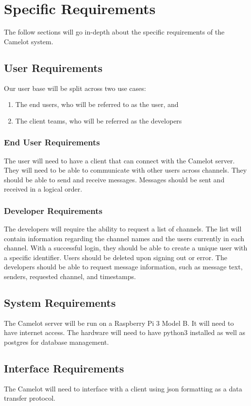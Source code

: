 \chapter{Specific Requirements}\label{specific-requirements}
The follow sections will go in-depth about the specific requirements of the Camelot system.

\section{User Requirements}\label{user-requirements}
Our user base will be split across two use cases:

\begin{enumerate}
    \item The end users, who will be referred to as the user, and
    \item The client teams, who will be referred as the developers
\end{enumerate}

\subsection{End User Requirements}\label{user-requirements-1}
The user will need to have a client that can connect with the Camelot server. They will need to be able to communicate with other users across channels. They should be able to send and receive messages. Messages should be sent and received in a logical order.

\subsection{Developer Requirements}\label{developer-requirements}
The developers will require the ability to request a list of channels. The list will contain information regarding the channel names and the users currently in each channel. With a successful login, they should be able to create a unique user with a specific identifier. Users should be deleted upon signing out or error. The developers should be able to request message information, such as message text, senders, requested channel, and timestamps.

\section{System Requirements}\label{system-requirements}
The Camelot server will be run on a Raspberry Pi 3 Model B. It will need to have internet access. The hardware will need to have \gls{python}3 installed as well as \gls{postgres} for database management.

\section{Interface Requirements}\label{interface-requirements}
The Camelot will need to interface with a client using \gls{json} formatting as a data transfer protocol.
